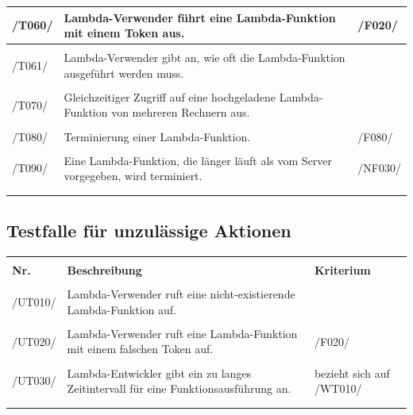 \documentclass[a4paper,20pt,oneside]{book}
\begin{document}
\begin{longtable}{lp{10cm}p{3cm}}
/T060/ & \Gls{Lambda-Verwender} führt eine \gls{Lambda-Funktion} mit einem \gls{Token} aus. & /F020/\\ \hline \\
/T061/ & \Gls{Lambda-Verwender} gibt an, wie oft die \gls{Lambda-Funktion} ausgeführt werden muss. & \\ \hline \\
/T070/ & Gleichzeitiger Zugriff auf eine hochgeladene \gls{Lambda-Funktion} von mehreren Rechnern aus. & \\ \hline \\
/T080/ & Terminierung einer \gls{Lambda-Funktion}. & /F080/\\ \hline \\
/T090/ & Eine Lambda-Funktion, die länger läuft als vom Server vorgegeben, wird terminiert. & /NF030/\\ \hline 
\hline
\\\\
\end{longtable}

\subsection{Testfalle für unzulässige Aktionen}
\begin{longtable}{lp{10cm}p{3cm}}
\hline \\
\textbf{Nr.} & \textbf{Beschreibung} & \textbf{Kriterium} \\ \hline\hline \\
/UT010/ & \Gls{Lambda-Verwender} ruft eine nicht-existierende \gls{Lambda-Funktion} auf. & \\ \hline \\
/UT020/ & \Gls{Lambda-Verwender} ruft eine \gls{Lambda-Funktion} mit einem falschen \gls{Token} auf. & /F020/\\ \hline \\
/UT030/ & \Gls{Lambda-Entwickler} gibt ein zu langes Zeitintervall für eine Funktionsausführung an. & bezieht sich auf /WT010/\\  \hline 
\hline
\\\\
\end{longtable}
\end{document}
